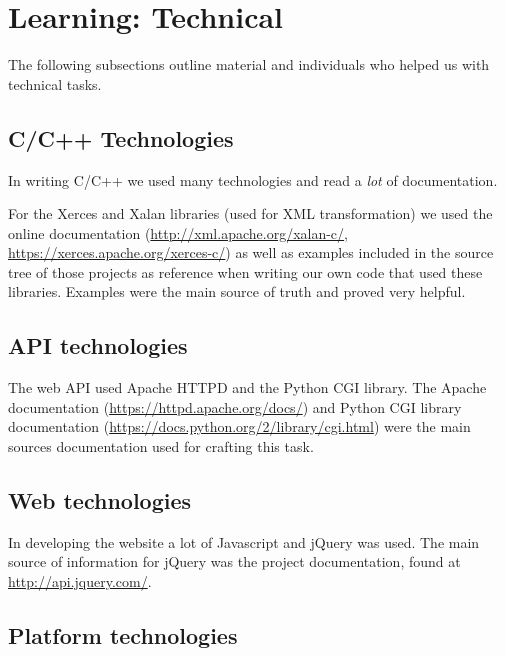 \section{Learning: Technical}

The following subsections outline material and individuals who helped us with technical tasks.

\subsection{C/C++ Technologies}

In writing C/C++ we used many technologies and read a \textit{lot} of documentation.

For the Xerces and Xalan libraries (used for XML transformation) we used the online documentation (\url{http://xml.apache.org/xalan-c/}, \url{https://xerces.apache.org/xerces-c/}) as well as examples included in the source tree of those projects as reference when writing our own code that used these libraries.
Examples were the main source of truth and proved very helpful.

\subsection{API technologies}

The web API used Apache HTTPD and the Python CGI library.
The Apache documentation (\url{https://httpd.apache.org/docs/}) and Python CGI library documentation (\url{https://docs.python.org/2/library/cgi.html}) were the main sources documentation used for crafting this task.

\subsection{Web technologies}

In developing the website a lot of Javascript and jQuery was used.
The main source of information for jQuery was the project documentation, found at \url{http://api.jquery.com/}.

\subsection{Platform technologies}

